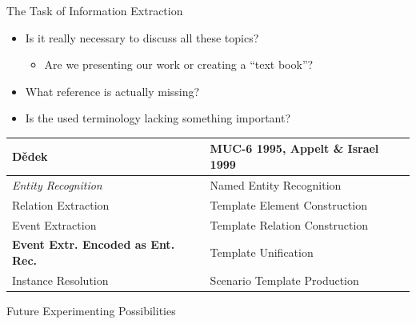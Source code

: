 \documentclass[xcolor=dvipsnames]{beamer}
\begin{document}
\begin{frame}{The Task of Information Extraction}
\begin{itemize}
	\item Is it really necessary to discuss all these topics?	
	\begin{itemize}
		\item Are we presenting our work or creating a ``text book''?
	\end{itemize}	
	\item What reference is actually missing?
	\item Is the used terminology lacking something important?
\end{itemize}
\begin{center}
	\begin{tabular}{l|l}
		Dědek & MUC-6 1995, Appelt \& Israel 1999\\
		\hline
		\emph{Entity Recognition} & Named Entity Recognition\\
		Relation Extraction & Template Element Construction\\
		Event Extraction & Template Relation Construction	\\
		\textbf{Event Extr. Encoded as Ent. Rec.} & Template Unification\\
		Instance Resolution & Scenario Template Production
	\end{tabular}
\end{center}
\end{frame}


\begin{frame}{Future Experimenting Possibilities}
\label{future_experiments}
\end{frame}
\end{document}
